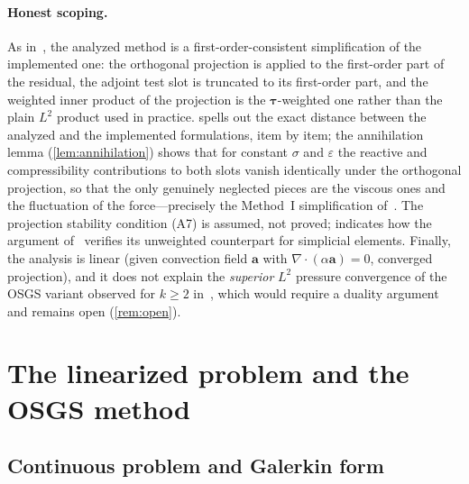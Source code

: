 \documentclass[11pt]{article}
\theoremstyle{remark}
\newcommand{\ba}{\boldsymbol{a}}
\begin{document}
\paragraph{Honest scoping.}
As in~\cite{Codina2008}, the analyzed method is a first-order-consistent simplification
of the implemented one: the orthogonal projection is applied to the first-order part of
the residual, the adjoint test slot is truncated to its first-order part, and the
weighted inner product of the projection is the $\boldsymbol{\tau}$-weighted one rather
than the plain $L^2$ product used in practice.  spells out the exact
distance between the analyzed and the implemented formulations, item by item; the
annihilation lemma (\cref{lem:annihilation}) shows that for constant $\sigma$ and
$\varepsilon$ the reactive and compressibility contributions to both slots vanish
identically under the orthogonal projection, so that the only genuinely neglected
pieces are the viscous ones and the fluctuation of the force---precisely the Method~I
simplification of~\cite{Codina2008}. The projection stability condition (A7) is assumed,
not proved; \cite{Codina2008} indicates how the argument of~\cite{CodinaBlasco1997}
verifies its unweighted counterpart for simplicial elements. Finally, the analysis is
linear (given convection field $\ba$ with $\nabla\cdot(\alpha\ba)=0$, converged
projection), and it does not explain the \emph{superior} $L^2$ pressure convergence of
the OSGS variant observed for $k\ge 2$ in~\cite{companion}, which would require a
duality argument and remains open (\cref{rem:open}).

\section{The linearized problem and the OSGS method}
\label{sec:setting}

\subsection{Continuous problem and Galerkin form}
\label{sec:continuous}
\end{document}
